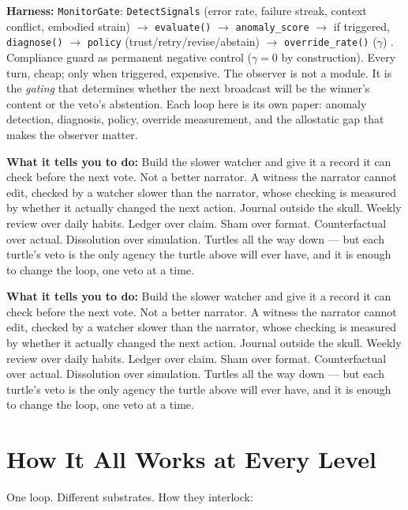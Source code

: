 \documentclass[11pt]{article}
\begin{document}
\textbf{Harness:} \texttt{MonitorGate}: \texttt{DetectSignals} (error rate, failure streak, context conflict, embodied strain) $\to$ \texttt{evaluate()} $\to$ \texttt{anomaly\_score} $\to$ if triggered, \texttt{diagnose()} $\to$ \texttt{policy} (trust/retry/revise/abstain) $\to$ \texttt{override\_rate()} ($\gamma$) \citep{macar2026,cao2026}. Compliance guard as permanent negative control ($\gamma=0$ by construction). Every turn, cheap; only when triggered, expensive. The observer is not a module. It is the \emph{gating} that determines whether the next broadcast will be the winner's content or the veto's abstention. Each loop here is its own paper: anomaly detection, diagnosis, policy, override measurement, and the allostatic gap that makes the observer matter.

\textbf{What it tells you to do:} Build the slower watcher and give it a record it can check before the next vote. Not a better narrator. A witness the narrator cannot edit, checked by a watcher slower than the narrator, whose checking is measured by whether it actually changed the next action. Journal outside the skull. Weekly review over daily habits. Ledger over claim. Sham over format. Counterfactual over actual. Dissolution over simulation. Turtles all the way down --- but each turtle's veto is the only agency the turtle above will ever have, and it is enough to change the loop, one veto at a time.

\textbf{What it tells you to do:} Build the slower watcher and give it a record it can check before the next vote. Not a better narrator. A witness the narrator cannot edit, checked by a watcher slower than the narrator, whose checking is measured by whether it actually changed the next action. Journal outside the skull. Weekly review over daily habits. Ledger over claim. Sham over format. Counterfactual over actual. Dissolution over simulation. Turtles all the way down --- but each turtle's veto is the only agency the turtle above will ever have, and it is enough to change the loop, one veto at a time.

\section{How It All Works at Every Level}
\label{sec:levels}

One loop. Different substrates. How they interlock:
\end{document}
